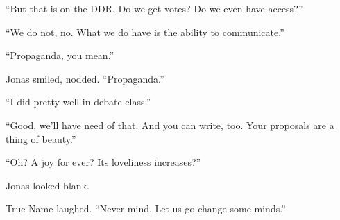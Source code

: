 ``But that is on the DDR. Do we get votes? Do we even have access?''

``We do not, no. What we do have is the ability to communicate.''

``Propaganda, you mean.''

Jonas smiled, nodded. ``Propaganda.''

``I did pretty well in debate class.''

``Good, we'll have need of that. And you can write, too. Your proposals are a thing of beauty.''

``Oh? A joy for ever? Its loveliness increases?''

Jonas looked blank.

True Name laughed. ``Never mind. Let us go change some minds.''
